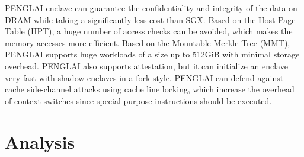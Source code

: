 \documentclass[12pt,twoside]{report}
\begin{document}
PENGLAI enclave\cite{feng2021scalable} can guarantee the confidentiality and integrity of the data on DRAM while taking a significantly less cost than SGX. Based on the Host Page Table (HPT), a huge number of access checks can be avoided, which makes the memory accesses more efficient. Based on the Mountable Merkle Tree (MMT), PENGLAI supports huge workloads of a size up to 512GiB with minimal storage overhead. PENGLAI also supports attestation, but it can initialize an enclave very fast with shadow enclaves in a fork-style. PENGLAI can defend against cache side-channel attacks using cache line locking, which increase the overhead of context switches since special-purpose instructions should be executed.














\section{Analysis}
\end{document}
